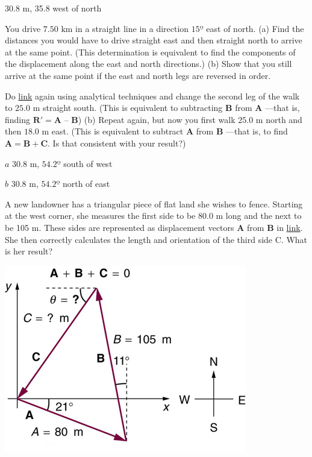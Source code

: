\documentclass[
]{book}
\begin{document}
\leavevmode{}%
30.8 m, 35.8 west of north

\hypertarget{fs-id1862376}{}
\leavevmode{}%
You drive \({7\text{.}\text{50\ km}}{}\) in a straight line in a direction
\(15º\) east of north. (a) Find the distances you would have to drive
straight east and then straight north to arrive at the same point. (This
determination is equivalent to find the components of the displacement
along the east and north directions.) (b) Show that you still arrive at
the same point if the east and north legs are reversed in order.

\hypertarget{fs-id1629683}{}
\leavevmode{}%
Do \protect\hyperlink{eip-287}{link} again using analytical
techniques and change the second leg of the walk to \(\text{25.0\ m}{}\)
straight south. (This is equivalent to subtracting \(\mathbf{B}{}\) from
\(\mathbf{A}{}\) ---that is, finding
\({\textbf{R}\prime = \textbf{A\ –\ B}}{}\)) (b) Repeat again, but now you
first walk \({\text{25}\text{.}\text{0\ m}}{}\) north and then
\({\text{18}\text{.}\text{0\ m}}{}\) east. (This is equivalent to subtract
\(\mathbf{A}{}\) from \(\mathbf{B}{}\) ---that is, to find
\({\mathbf{A} = {\mathbf{B} + \mathbf{C}}}{}\). Is that consistent with
your result?)

\leavevmode{}%
\(a\) \({\text{30}\text{.}\text{8\ m}}{}\), \({\text{54}\text{.}2º}{}\)
south of west

\(b\) \({\text{30}\text{.}\text{8\ m}}{}\), \({\text{54}\text{.}2º}{}\)
north of east

\hypertarget{fs-id1956316}{}
\leavevmode{}%
A new landowner has a triangular piece of flat land she wishes to fence.
Starting at the west corner, she measures the first side to be 80.0 m
long and the next to be 105 m. These sides are represented as
displacement vectors \(\mathbf{A}{}\) from \(\mathbf{B}{}\) in
\protect\hyperlink{eip-id3165265}{link}. She then correctly
calculates the length and orientation of the third side \(\text{C}{}\).
What is her result?

\includegraphics{images/Figure_03_03_11a.jpg}
\end{document}
